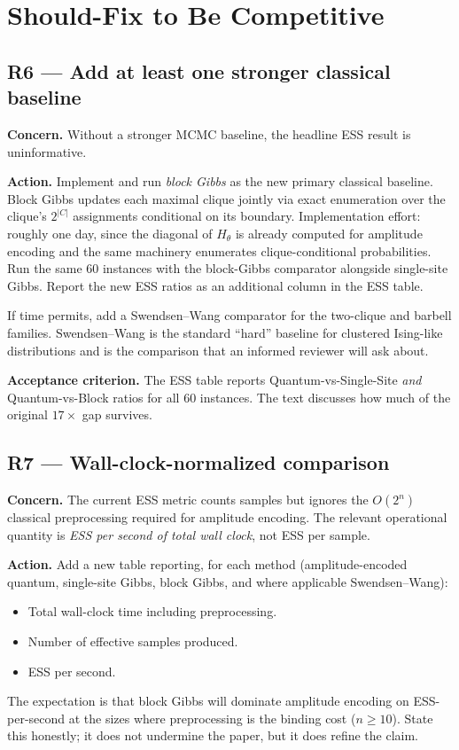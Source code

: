 \documentclass[conference,10pt]{IEEEtran}
\begin{document}
\section{Should-Fix to Be Competitive}

\subsection{R6 --- Add at least one stronger classical baseline}

\textbf{Concern.} Without a stronger MCMC baseline, the headline ESS
result is uninformative.

\textbf{Action.} Implement and run \emph{block Gibbs} as the new primary
classical baseline. Block Gibbs updates each maximal clique jointly via
exact enumeration over the clique's $2^{|C|}$ assignments conditional on
its boundary. Implementation effort: roughly one day, since the diagonal
of $H_\theta$ is already computed for amplitude encoding and the same
machinery enumerates clique-conditional probabilities. Run the same 60
instances with the block-Gibbs comparator alongside single-site Gibbs.
Report the new ESS ratios as an additional column in the ESS table.

If time permits, add a Swendsen--Wang comparator for the two-clique and
barbell families. Swendsen--Wang is the standard ``hard'' baseline for
clustered Ising-like distributions and is the comparison that an
informed reviewer will ask about.

\textbf{Acceptance criterion.} The ESS table reports Quantum-vs-Single-Site
\emph{and} Quantum-vs-Block ratios for all 60 instances. The text
discusses how much of the original $17\times$ gap survives.

\subsection{R7 --- Wall-clock-normalized comparison}

\textbf{Concern.} The current ESS metric counts samples but ignores the
$O(2^n)$ classical preprocessing required for amplitude encoding. The
relevant operational quantity is \emph{ESS per second of total wall
clock}, not ESS per sample.

\textbf{Action.} Add a new table reporting, for each method
(amplitude-encoded quantum, single-site Gibbs, block Gibbs, and where
applicable Swendsen--Wang):
\begin{itemize}[leftmargin=*]
    \item Total wall-clock time including preprocessing.
    \item Number of effective samples produced.
    \item ESS per second.
\end{itemize}
The expectation is that block Gibbs will dominate amplitude encoding on
ESS-per-second at the sizes where preprocessing is the binding cost
($n \ge 10$). State this honestly; it does not undermine the paper, but
it does refine the claim.
\end{document}
